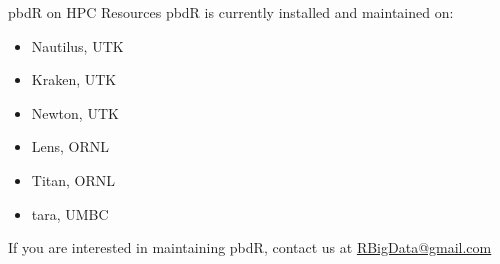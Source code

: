 

\begin{frame}
  \begin{block}{pbdR on HPC Resources}
    pbdR is currently installed and maintained on:
    \begin{itemize}
      \item Nautilus, UTK
      \item Kraken, UTK
      \item Newton, UTK
      \item Lens, ORNL
      \item Titan, ORNL
      \item tara, UMBC

    \end{itemize}
    If you are interested in maintaining pbdR, contact us at 
\url{RBigData@gmail.com}
  \end{block}
\end{frame}


